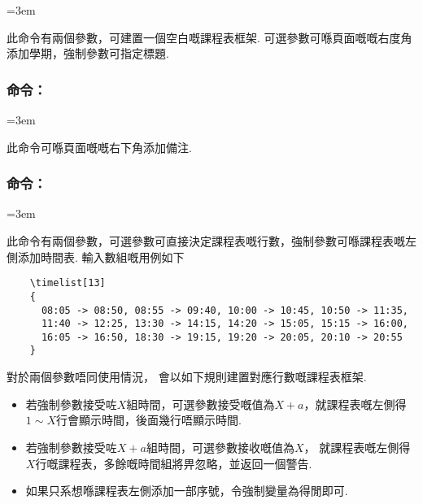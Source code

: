 \documentclass[letterpaper]{l3doc}
\newenvironment{example}{\begin{list}{}{\leftmargin=3em}\item }{\end{list}}
\begin{document}
\begin{example}
    \qquad
\end{example}

此命令有兩個參數，可建置一個空白嘅課程表框架. 可選參數可喺頁面嘅嘅右度角添加學期，強制參數可指定標題.

\subsubsection{命令：}

\begin{example}
\end{example}

此命令可喺頁面嘅嘅右下角添加備注.

\subsubsection{命令：}

\begin{example}
    \qquad
\end{example}

此命令有兩個參數，可選參數可直接決定課程表嘅行數，強制參數可喺課程表嘅左側添加時間表. 輸入數組嘅用例如下

\begin{Verbatim}
    \timelist[13]
    {
      08:05 -> 08:50, 08:55 -> 09:40, 10:00 -> 10:45, 10:50 -> 11:35,
      11:40 -> 12:25, 13:30 -> 14:15, 14:20 -> 15:05, 15:15 -> 16:00,
      16:05 -> 16:50, 18:30 -> 19:15, 19:20 -> 20:05, 20:10 -> 20:55
    }
\end{Verbatim}

對於兩個參數唔同使用情況， 會以如下規則建置對應行數嘅課程表框架.

\begin{itemize}
    \item 若強制參數接受咗$X$組時間，可選參數接受嘅值為$X+a$，就課程表嘅左側得$1 \sim X$行會顯示時間，後面幾行唔顯示時間.
    \item 若強制參數接受咗$X+a$組時間，可選參數接收嘅值為$X$， 就課程表嘅左側得$X$行嘅課程表，多餘嘅時間組將畀忽略，並返回一個警告.
    \item 如果只系想喺課程表左側添加一部序號，令強制變量為得閒即可.
\end{itemize}
\end{document}
